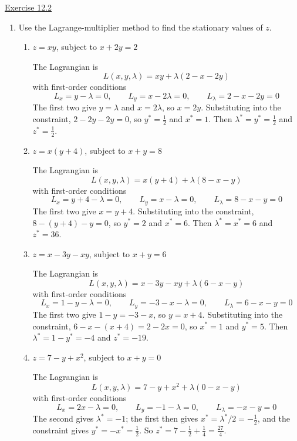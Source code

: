\underline{Exercise 12.2}
\begin{enumerate}
\item[1.] Use the Lagrange-multiplier method to find the stationary values of $z$.
\begin{enumerate}
\item[(a)] $z = xy$, subject to $x + 2y = 2$

The Lagrangian is
\[L(x, y, \lambda) = xy + \lambda(2 - x - 2y)\]
with first-order conditions
\[L_x = y - \lambda = 0, \qquad L_y = x - 2\lambda = 0, \qquad L_\lambda = 2 - x - 2y = 0\]
The first two give $y = \lambda$ and $x = 2\lambda$, so $x = 2y$. Substituting into the constraint, $2 - 2y - 2y = 0$, so $y^{*} = \tfrac{1}{2}$ and $x^{*} = 1$. Then $\lambda^{*} = y^{*} = \tfrac{1}{2}$ and $z^{*} = \tfrac{1}{2}$.

\item[(b)] $z = x(y + 4)$, subject to $x + y = 8$

The Lagrangian is
\[L(x, y, \lambda) = x(y + 4) + \lambda(8 - x - y)\]
with first-order conditions
\[L_x = y + 4 - \lambda = 0, \qquad L_y = x - \lambda = 0, \qquad L_\lambda = 8 - x - y = 0\]
The first two give $x = y + 4$. Substituting into the constraint, $8 - (y + 4) - y = 0$, so $y^{*} = 2$ and $x^{*} = 6$. Then $\lambda^{*} = x^{*} = 6$ and $z^{*} = 36$.

\item[(c)] $z = x - 3y - xy$, subject to $x + y = 6$

The Lagrangian is
\[L(x, y, \lambda) = x - 3y - xy + \lambda(6 - x - y)\]
with first-order conditions
\[L_x = 1 - y - \lambda = 0, \qquad L_y = -3 - x - \lambda = 0, \qquad L_\lambda = 6 - x - y = 0\]
The first two give $1 - y = -3 - x$, so $y = x + 4$. Substituting into the constraint, $6 - x - (x + 4) = 2 - 2x = 0$, so $x^{*} = 1$ and $y^{*} = 5$. Then $\lambda^{*} = 1 - y^{*} = -4$ and $z^{*} = -19$.

\item[(d)] $z = 7 - y + x^{2}$, subject to $x + y = 0$

The Lagrangian is
\[L(x, y, \lambda) = 7 - y + x^{2} + \lambda(0 - x - y)\]
with first-order conditions
\[L_x = 2x - \lambda = 0, \qquad L_y = -1 - \lambda = 0, \qquad L_\lambda = -x - y = 0\]
The second gives $\lambda^{*} = -1$; the first then gives $x^{*} = \lambda^{*}/2 = -\tfrac{1}{2}$, and the constraint gives $y^{*} = -x^{*} = \tfrac{1}{2}$. So $z^{*} = 7 - \tfrac{1}{2} + \tfrac{1}{4} = \tfrac{27}{4}$.
\end{enumerate}


\end{enumerate}
